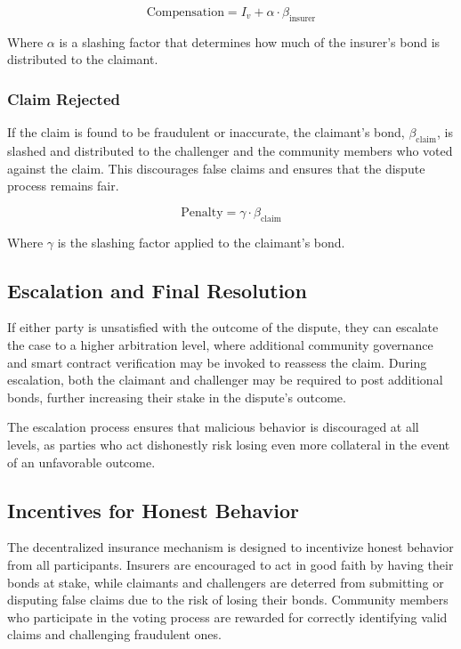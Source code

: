 \documentclass{article}
\begin{document}
\[
\text{Compensation} = I_v + \alpha \cdot \beta_{\text{insurer}}
\]

Where $\alpha$ is a slashing factor that determines how much of the insurer’s bond is distributed to the claimant.

\subsubsection{Claim Rejected}
If the claim is found to be fraudulent or inaccurate, the claimant’s bond, $\beta_{\text{claim}}$, is slashed and distributed to the challenger and the community members who voted against the claim. This discourages false claims and ensures that the dispute process remains fair.

\[
\text{Penalty} = \gamma \cdot \beta_{\text{claim}}
\]

Where $\gamma$ is the slashing factor applied to the claimant's bond.

\subsection{Escalation and Final Resolution}

If either party is unsatisfied with the outcome of the dispute, they can escalate the case to a higher arbitration level, where additional community governance and smart contract verification may be invoked to reassess the claim. During escalation, both the claimant and challenger may be required to post additional bonds, further increasing their stake in the dispute’s outcome.

The escalation process ensures that malicious behavior is discouraged at all levels, as parties who act dishonestly risk losing even more collateral in the event of an unfavorable outcome.

\subsection{Incentives for Honest Behavior}

The decentralized insurance mechanism is designed to incentivize honest behavior from all participants. Insurers are encouraged to act in good faith by having their bonds at stake, while claimants and challengers are deterred from submitting or disputing false claims due to the risk of losing their bonds. Community members who participate in the voting process are rewarded for correctly identifying valid claims and challenging fraudulent ones.
\end{document}
